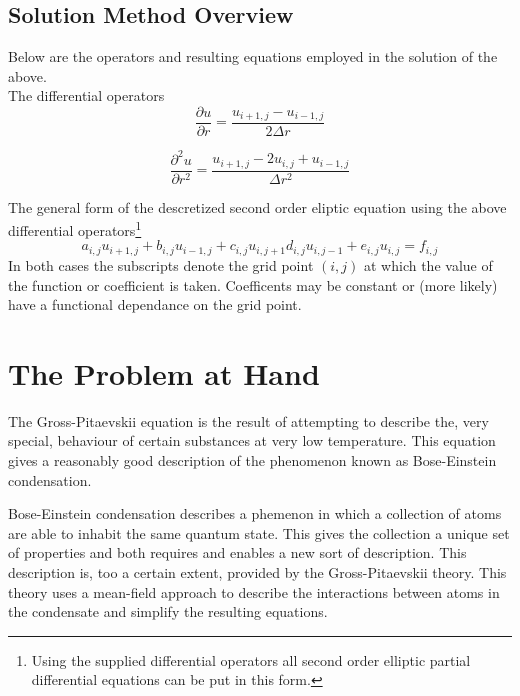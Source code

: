 \documentclass{article}
\begin{document}
\subsection{Solution Method Overview}
Below are the operators and resulting equations employed in the solution of the above.\\

The differential operators
\begin{equation}
\frac{\partial u}{\partial r} = \frac{u_{i+1, j} - u_{i-1, j}}{2\Delta r}
\end{equation}

\begin{equation}
\frac{\partial^{2} u}{\partial r^{2}} =
\frac{u_{i+1,j} - 2 u_{i,j} +u_{i-1,j}}{\Delta r^{2}}
\end{equation}

The general form of the descretized second order eliptic equation using the
above differential operators\footnote{Using the supplied differential operators
all second order elliptic partial differential equations can be put in this
form.}
\begin{equation}
a_{i,j} u_{i+1, j} + b_{i,j} u_{i-1, j} + c_{i,j} u_{i, j+1} d_{i,j} u_{i, j-1}
+ e_{i,j} u_{i, j} = f_{i,j}
\end{equation}
In both cases the subscripts denote the grid point $(i,j)$ at which the value of the
function or coefficient is taken. Coefficents may be constant or (more likely)
have a functional dependance on the grid point.

\section{The Problem at Hand}

The Gross-Pitaevskii equation is the result of attempting to describe the,
very special, behaviour of certain substances at very low temperature. This
equation gives a reasonably good description of the phenomenon known as
Bose-Einstein condensation.


Bose-Einstein condensation describes a phemenon in which a collection of
atoms are able to inhabit the same quantum state. This gives the collection
a unique set of properties and both requires and enables a new sort of
description. This description is, too a certain extent, provided by
the Gross-Pitaevskii theory. This theory uses a mean-field approach to
describe the interactions between atoms in the condensate and simplify
the resulting equations.
\end{document}

